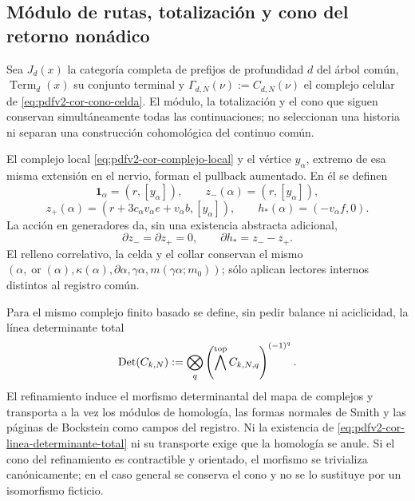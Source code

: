 \subsection{Módulo de rutas, totalización y cono del retorno nonádico}
Sea \(J_d(x)\) la categoría completa de prefijos de profundidad \(d\) del
árbol común, \(\operatorname{Term}_d(x)\) su conjunto terminal y
\(\Gamma_{d,N}(\nu):=C_{d,N}(\nu)\) el complejo celular de
\eqref{eq:pdfv2-cor-cono-celda}. El módulo, la totalización y el cono que
siguen conservan simultáneamente todas las continuaciones; no seleccionan
una historia ni separan una construcción cohomológica del continuo común.
\begingroup
  \let\section\subsection
  
\endgroup

El complejo local \eqref{eq:pdfv2-cor-complejo-local} y el vértice
\(y_\alpha\), extremo de esa misma extensión en el nervio, forman el pullback
aumentado. En él se definen
\begin{equation}
\label{eq:pdfv2-cor-zpm-h}
 \mathbf1_\alpha=(r,[y_\alpha]),\qquad
 z_-(\alpha)=(r,[y_\alpha]),
\end{equation}
\begin{equation}
\label{eq:pdfv2-cor-zplus-h}
 z_+(\alpha)=
 (r+3c_\alpha v_\alpha e+v_\alpha b,[y_\alpha]),
 \qquad
 h_*(\alpha)=(-v_\alpha f,0).
\end{equation}
La acción en generadores da, sin una existencia abstracta adicional,
\begin{equation}
\label{eq:pdfv2-cor-filler}
 \partial z_-=\partial z_+=0,\qquad
 \partial h_*=z_--z_+.
\end{equation}
El relleno correlativo, la celda y el collar conservan el mismo
\((\alpha,\operatorname{or}(\alpha),\kappa(\alpha),\partial\alpha,
\gamma\alpha,m(\gamma\alpha;m_0))\); sólo aplican lectores internos distintos
al registro común.

Para el mismo complejo finito basado se define, sin pedir balance ni
aciclicidad, la línea determinante total
\begin{equation}
\label{eq:pdfv2-cor-linea-determinante-total}
 \operatorname{Det}(C_{k,N}):=
 \bigotimes_q
 \left(\bigwedge^{\rm top}C_{k,N,q}\right)^{(-1)^q}.
\end{equation}
El refinamiento induce el morfismo determinantal del mapa de complejos y
transporta a la vez los módulos de homología, las formas normales de Smith y
las páginas de Bockstein como campos del registro. Ni la existencia de
\eqref{eq:pdfv2-cor-linea-determinante-total} ni su transporte exige que la
homología se anule. Si el cono del refinamiento es contractible y orientado,
el morfismo se trivializa canónicamente; en el caso general se conserva el
cono y no se lo sustituye por un isomorfismo ficticio.

